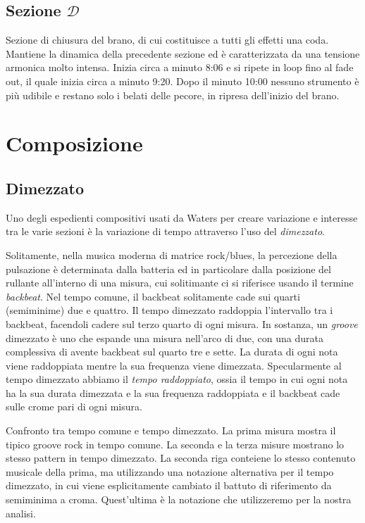 \documentclass[class=book, crop=false, oneside, 12pt]{standalone}
\begin{document}
    
    \subsection{Sezione \(\mathcal{D}\)}
    Sezione di chiusura del brano, di cui costituisce a tutti gli effetti una coda. Mantiene la dinamica della precedente sezione ed è caratterizzata da una tensione armonica molto intensa. Inizia circa a minuto 8:06 e si ripete in loop fino al fade out, il quale inizia circa a minuto 9:20. Dopo il minuto 10:00 nessuno strumento è più udibile e restano solo i belati delle pecore, in ripresa dell'inizio del brano.
    
    \section{Composizione}
    \label{sec:03-arrangement}

    \subsection{Dimezzato}
    Uno degli espedienti compositivi usati da Waters per creare variazione e interesse tra le varie sezioni è la variazione di tempo attraverso l'uso del \emph{dimezzato}. 

    Solitamente, nella musica moderna di matrice rock/blues, la percezione della pulsazione  è determinata dalla batteria ed in particolare dalla posizione del rullante all'interno di una misura, cui solitimante ci si riferisce usando il termine \emph{backbeat}. Nel tempo comune, il backbeat solitamente cade  sui quarti (semiminime) due e quattro. Il tempo dimezzato raddoppia l'intervallo tra i backbeat, facendoli cadere sul terzo quarto di ogni misura. In sostanza, un \emph{groove} dimezzato è uno che espande una misura nell'arco di due, con una durata complessiva di  avente backbeat sul quarto tre e sette. La durata di ogni nota viene raddoppiata mentre la sua frequenza viene dimezzata. Specularmente al tempo dimezzato abbiamo il \emph{tempo raddoppiato}, ossia il tempo in cui ogni nota ha la sua durata dimezzata e la sua frequenza raddoppiata e il backbeat cade sulle crome pari di ogni misura.

    \begin{sheet}[htbp]
        \centering
        \caption[Confronto tra tempo comune e tempo dimezzato.]{Confronto tra tempo comune e tempo dimezzato. La prima misura mostra il tipico groove rock in tempo comune. La seconda e la terza misure mostrano lo stesso pattern in tempo dimezzato. La seconda riga conteiene lo stesso contenuto musicale della prima, ma utilizzando una notazione alternativa per il tempo dimezzato, in cui viene esplicitamente cambiato il battuto di riferimento da semiminima a croma. Quest'ultima è la notazione che utilizzeremo per la nostra analisi.}
        \label{sheet:common-vs-half-time}
    \end{sheet}
\end{document}

